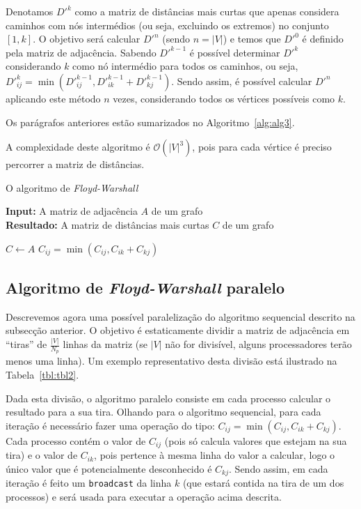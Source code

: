\documentclass[10pt,a4paper,oneside]{article}
\newcommand{\BigO}[1]{\mathcal{O}(#1)}
\begin{document}
Denotamos $D'^k$ como a matriz de distâncias mais curtas que apenas
considera caminhos com nós intermédios (ou seja, excluindo os
extremos) no conjunto $[1, k]$. O objetivo será calcular $D'^n$ (sendo
$n = |V|$) e temos que $D'^0$ é definido pela matriz de
adjacência. Sabendo $D'^{k - 1}$ é possível determinar $D'^k$
considerando $k$ como nó intermédio para todos os caminhos, ou seja,
$D'^k_{ij} = \min{(D'^{k - 1}_{ij}, D'^{k - 1}_{ik} + D'^{k -
    1}_{kj})}$. Sendo assim, é possível calcular $D'^n$ aplicando este
método $n$ vezes, considerando todos os vértices possíveis como $k$.

Os parágrafos anteriores estão sumarizados no Algoritmo~\ref{alg:alg3}.

A complexidade deste algoritmo é $\BigO{|V|^3}$, pois para cada
vértice é preciso percorrer a matriz de distâncias.

\begin{algorithm}[t]
\small
\caption{O algoritmo de \textit{Floyd-Warshall}}
\renewcommand{\arraystretch}{0.85}
\textbf{Input:} A matriz de adjacência $A$ de um grafo\\
\textbf{Resultado:} A matriz de distâncias mais curtas $C$ de um grafo\\
\renewcommand{\arraystretch}{1.0}
\label{alg:alg3}
\begin{algorithmic}[1]
\State $C \leftarrow A$
      \State $C_{ij} = \min{(C_{ij}, C_{ik} + C_{kj})}$
    \EndFor
  \EndFor
\EndFor
\end{algorithmic}
\end{algorithm}

\subsection{Algoritmo de \textit{Floyd-Warshall} paralelo}
Descrevemos agora uma possível paralelização do algoritmo sequencial
descrito na subsecção anterior. O objetivo é estaticamente dividir a
matriz de adjacência em ``tiras'' de $\frac{|V|}{N_p}$ linhas da
matriz (se $|V|$ não for divisível, alguns processadores terão menos
uma linha). Um exemplo representativo desta divisão está ilustrado na
Tabela~\ref{tbl:tbl2}.

Dada esta divisão, o algoritmo paralelo consiste em cada processo
calcular o resultado para a sua tira. Olhando para o algoritmo
sequencial, para cada iteração é necessário fazer uma operação do
tipo: $C_{ij} = \min{(C_{ij}, C_{ik} + C_{kj})}$. Cada processo contém
o valor de $C_{ij}$ (pois só calcula valores que estejam na sua tira)
e o valor de $C_{ik}$, pois pertence à mesma linha do valor a
calcular, logo o único valor que é potencialmente desconhecido é
$C_{kj}$. Sendo assim, em cada iteração é feito um {\tt broadcast} da
linha $k$ (que estará contida na tira de um dos processos) e será
usada para executar a operação acima descrita.
\end{document}
